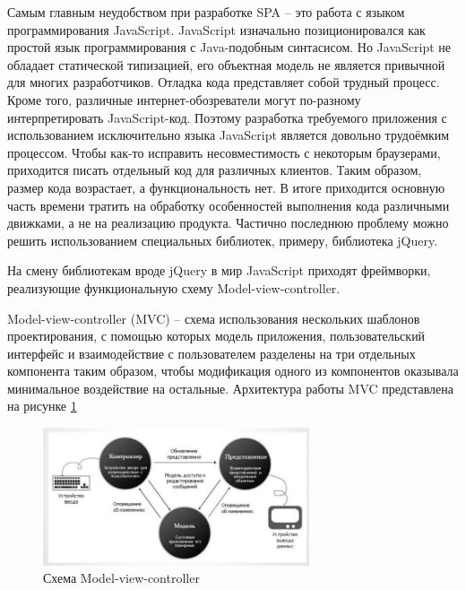 Самым главным неудобством при разработке SPA -- это работа с языком программирования JavaScript. JavaScript изначально позиционировался как простой язык программирования с Java-подобным синтасисом. Но  JavaScript не обладает статической типизацией, его объектная модель не является привычной для многих разработчиков. Отладка кода представляет собой трудный процесс. Кроме того, различные интернет-обозреватели могут по-разному интерпретировать JavaScript-код. Поэтому разработка требуемого приложения с использованием исключительно языка JavaScript является довольно трудоёмким процессом. Чтобы как-то исправить несовместимость с некоторым браузерами, приходится писать отдельный код для различных клиентов. Таким образом, размер кода возрастает, а функциональность нет. В итоге приходится основную часть времени тратить на обработку особенностей выполнения кода различными движками, а не на реализацию продукта. Частично последнюю проблему можно решить использованием специальных библиотек, примеру, библиотека jQuery.  



На смену библиотекам вроде jQuery в мир JavaScript приходят фреймворки, реализующие функциональную схему Model-view-controller. 

Model-view-controller (MVC) -- схема использования нескольких шаблонов проектирования, с помощью которых модель приложения, пользовательский интерфейс и взаимодействие с пользователем разделены на три отдельных компонента таким образом, чтобы модификация одного из компонентов оказывала минимальное воздействие на остальные. Архитектура работы MVC представлена на рисунке \ref{mvc}

\begin{figure}[h]

\center\includegraphics[width=0.7\textwidth]{mvc}

\caption{Схема Model-view-controller}\label{mvc}

\end{figure}

